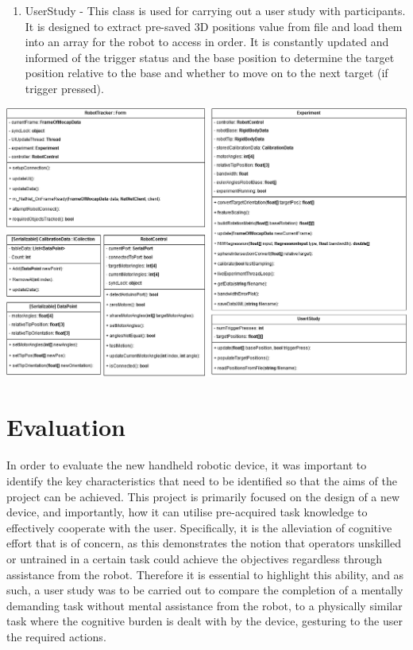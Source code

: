 \documentclass[11pt]{article}
\begin{document}
\begin{enumerate}
\item{UserStudy - This class is used for carrying out a user study with participants. It is designed to extract pre-saved 3D positions value from file and load them into an array for the robot to access in order. It is constantly updated and informed of the trigger status and the base position to determine the target position relative to the base and whether to move on to the next target (if trigger pressed).}
\end{enumerate}


\begin{landscape}

\begin{center}
\includegraphics[width=1.4\textwidth]{images/classDiagram2.png}
\label{figure:classDiagram}
\end{center}


\end{landscape}



\section{Evaluation}

In order to evaluate the new handheld robotic device, it was important to identify the key characteristics that need to be identified so that the aims of the project can be achieved. This project is primarily focused on the design of a new device, and importantly, how it can utilise pre-acquired task knowledge to effectively cooperate with the user. Specifically, it is the alleviation of cognitive effort that is of concern, as this demonstrates the notion that operators unskilled or untrained in a certain task could achieve the objectives regardless through assistance from the robot. Therefore it is essential to highlight this ability, and as such, a user study was to be carried out to compare the completion of a mentally demanding task without mental assistance from the robot, to a physically similar task where the cognitive burden is dealt with by the device, gesturing to the user the required actions.
\end{document}
